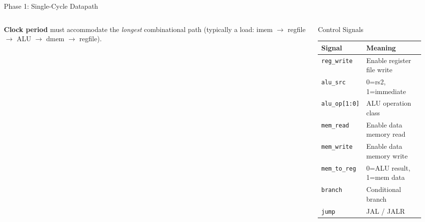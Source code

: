 \documentclass[aspectratio=169,10pt]{beamer}
\begin{document}
\begin{frame}{Phase 1: Single-Cycle Datapath}
\begin{columns}[T]
\begin{column}{0.52\textwidth}
      \vspace{0.5em}
      \textbf{Clock period} must accommodate the \emph{longest} combinational path (typically a load: imem $\to$ regfile $\to$ ALU $\to$ dmem $\to$ regfile).
    \end{column}
    \begin{column}{0.44\textwidth}
      \begin{block}{Control Signals}
        \renewcommand{\arraystretch}{1.1}
        \scriptsize
        \begin{tabular}{lp{3.8cm}}
          \toprule
          Signal & Meaning \\
          \midrule
          \texttt{reg\_write}  & Enable register file write \\
          \texttt{alu\_src}    & 0=rs2, 1=immediate \\
          \texttt{alu\_op[1:0]}& ALU operation class \\
          \texttt{mem\_read}   & Enable data memory read \\
          \texttt{mem\_write}  & Enable data memory write \\
          \texttt{mem\_to\_reg}& 0=ALU result, 1=mem data \\
          \texttt{branch}      & Conditional branch \\
          \texttt{jump}        & JAL / JALR \\
          \bottomrule
        \end{tabular}
      \end{block}
    \end{column}
  \end{columns}
\end{frame}
\end{document}
